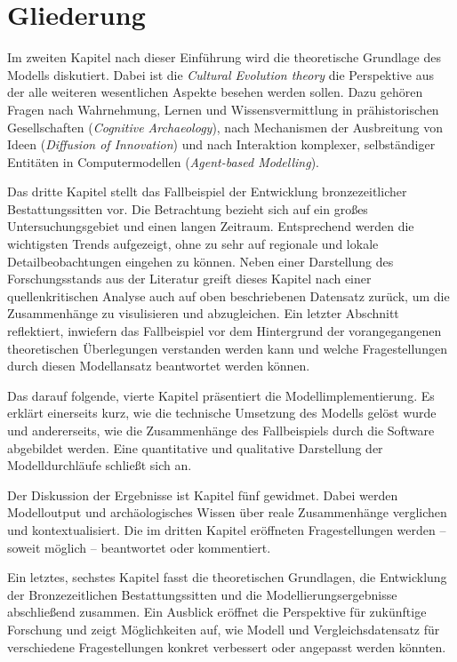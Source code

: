 \documentclass[openany,twoside,twocolumn]{book}
\begin{document}
\hypertarget{gliederung}{%
\section{Gliederung}\label{gliederung}}

Im zweiten Kapitel nach dieser Einführung wird die theoretische
Grundlage des Modells diskutiert. Dabei ist die \emph{Cultural Evolution
theory} die Perspektive aus der alle weiteren wesentlichen Aspekte
besehen werden sollen. Dazu gehören Fragen nach Wahrnehmung, Lernen und
Wissensvermittlung in prähistorischen Gesellschaften (\emph{Cognitive
Archaeology}), nach Mechanismen der Ausbreitung von Ideen
(\emph{Diffusion of Innovation}) und nach Interaktion komplexer,
selbständiger Entitäten in Computermodellen (\emph{Agent-based
Modelling}).

Das dritte Kapitel stellt das Fallbeispiel der Entwicklung
bronzezeitlicher Bestattungssitten vor. Die Betrachtung bezieht sich auf
ein großes Untersuchungsgebiet und einen langen Zeitraum. Entsprechend
werden die wichtigsten Trends aufgezeigt, ohne zu sehr auf regionale und
lokale Detailbeobachtungen eingehen zu können. Neben einer Darstellung
des Forschungsstands aus der Literatur greift dieses Kapitel nach einer
quellenkritischen Analyse auch auf oben beschriebenen Datensatz zurück,
um die Zusammenhänge zu visulisieren und abzugleichen. Ein letzter
Abschnitt reflektiert, inwiefern das Fallbeispiel vor dem Hintergrund
der vorangegangenen theoretischen Überlegungen verstanden werden kann
und welche Fragestellungen durch diesen Modellansatz beantwortet werden
können.

Das darauf folgende, vierte Kapitel präsentiert die
Modellimplementierung. Es erklärt einerseits kurz, wie die technische
Umsetzung des Modells gelöst wurde und andererseits, wie die
Zusammenhänge des Fallbeispiels durch die Software abgebildet werden.
Eine quantitative und qualitative Darstellung der Modelldurchläufe
schließt sich an.

Der Diskussion der Ergebnisse ist Kapitel fünf gewidmet. Dabei werden
Modelloutput und archäologisches Wissen über reale Zusammenhänge
verglichen und kontextualisiert. Die im dritten Kapitel eröffneten
Fragestellungen werden -- soweit möglich -- beantwortet oder
kommentiert.

Ein letztes, sechstes Kapitel fasst die theoretischen Grundlagen, die
Entwicklung der Bronzezeitlichen Bestattungssitten und die
Modellierungsergebnisse abschließend zusammen. Ein Ausblick eröffnet die
Perspektive für zukünftige Forschung und zeigt Möglichkeiten auf, wie
Modell und Vergleichsdatensatz für verschiedene Fragestellungen konkret
verbessert oder angepasst werden könnten.
\end{document}
